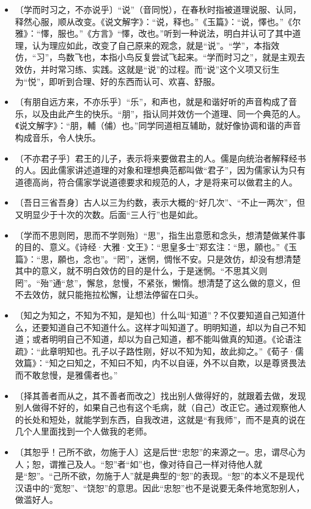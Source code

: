 \documentclass[12pt,UTF-8,openany,a4]{ctexbook}
\begin{document}
\begin{itemize}
    \setlength\itemsep{-0.2em}
    \item〔学而时习之，不亦说乎〕{\yiwen “说”（音同悦），在春秋时指被道理说服、认同，释然心服，顺从改变。《说文解字》：“说，释也。”《玉篇》：“说，懌也。”《尔雅》：“懌，服也。”《方言》“懌，改也。”听到一种说法，明白并认可了其中道理，认为理应如此，改变了自己原来的观念，就是“说”。“学”，本指效仿，“习”，鸟数飞也，本指小鸟反复尝试飞起来。“学而时习之”，就是主观去效仿，并时常习练、实践。这就是“说”的过程。而“说”这个义项又衍生为“悦”，即听到合理、好的东西而认可、欢喜、舒服。}
    \item〔有朋自远方来，不亦乐乎〕{\yiwen “乐”，和声也，就是和谐好听的声音构成了音乐，以及由此产生的快乐。“朋”，指认同并效仿一个道理、同一个典范的人。《说文解字》：“朋，輔（俌）也。”同学同道相互辅助，就好像协调和谐的声音构成音乐，令人快乐。}
    \item〔不亦君子乎〕{\yiwen 君王的儿子，表示将来要做君主的人。儒是向统治者解释经书的人。因此儒家讲述道理的对象和理想典范都叫做“君子”，因为儒家认为只有道德高尚，符合儒家学说道德要求和规范的人，才是将来可以做君主的人。}
    \item〔吾日三省吾身〕{\yiwen 古人以三为约数，表示大概的“好几次”、“不止一两次”，但又明显少于十次的次数。后面“三人行”也是如此。}
    \item〔学而不思则罔，思而不学则殆〕{\yiwen “思”，指生出意愿和念头，想清楚做某件事的目的、意义。《诗经·大雅·文王》：“思皇多士”郑玄注：“思，願也。”《玉篇》：“思，願也，念也”。“罔”，迷惘，惆怅不安。只是效仿，却没有想清楚其中的意义，就不明白效仿的目的是什么，于是迷惘。“不思其义则罔”。“殆”通“怠”，懈怠，怠慢，不紧张，懒惰。想清楚了这么做的意义，但不去效仿，就只能拖拉松懈，让想法停留在口头。}
    \item〔知之为知之，不知为不知，是知也〕{\yiwen 什么叫“知道”？不仅要知道自己知道什么，还要知道自己不知道什么。这样才叫知道了。明明知道，却以为自己不知道；或者明明自己不知道，却以为自己知道，都不能叫做真的知道。《论语注疏》：“此章明知也。孔子以子路性刚，好以不知为知，故此抑之。”《荀子·儒效篇》：“知之曰知之，不知曰不知，内不以自诬，外不以自欺，以是尊贤畏法而不敢怠慢，是雅儒者也。”}
    \item〔择其善者而从之，其不善者而改之〕{\yiwen 找出别人做得好的，就跟着去做，发现别人做得不好的，如果自己也有这个毛病，就（自己）改正它。通过观察他人的长处和短处，就能学到东西，自我改进，这就是“有我师”，而不是真的说在几个人里面找到一个人做我的老师。}
    \item〔其恕乎！己所不欲，勿施于人〕{\yiwen 这是后世“忠恕”的来源之一。忠，谓尽心为人；恕，谓推己及人。“恕”者“如”也，像对待自己一样对待他人就是“恕”。“己所不欲，勿施于人”就是典型的“恕”的表现。“恕”的本义不是现代汉语中的“宽恕”、“饶恕”的意思。因此“忠恕”也不是说要无条件地宽恕别人，做滥好人。}
\end{itemize}
\end{document}
